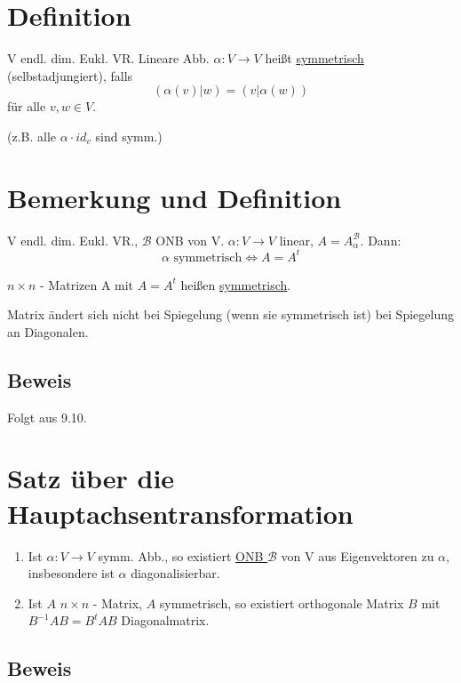 \documentclass[a4paper, openany]{book}
\begin{document}
        \section{Definition}

        V endl. dim. Eukl. VR. Lineare Abb. $\alpha : V \rightarrow V$ heißt \underline{symmetrisch} (selbstadjungiert), falls \[ (\alpha(v) | w) = (v | \alpha(w)) \] für alle $v,w \in V$.

        (z.B. alle $\alpha \cdot id_v$ sind symm.)

        \section{Bemerkung und Definition}

        V endl. dim. Eukl. VR., $\mathcal{B}$ ONB von V. $\alpha: V \rightarrow V$ linear, $A = A_{\alpha}^{\mathcal{B}}$. Dann: \[ \alpha \text{ symmetrisch} \Leftrightarrow A = A^t \]

        $n \times n$ - Matrizen A mit $A = A^t$ heißen \underline{symmetrisch}.

        \par \medskip

        Matrix ändert sich nicht bei Spiegelung (wenn sie symmetrisch ist) bei Spiegelung an Diagonalen.

        \subsection{Beweis}

        Folgt aus 9.10.

        \section{Satz über die Hauptachsentransformation}


        \begin{enumerate}[label=(\alph*)]
          \item Ist $\alpha: V \rightarrow V$ symm. Abb., so existiert \underline{ONB $\mathcal{B}$} von V aus Eigenvektoren zu $\alpha$, insbesondere ist $\alpha$ diagonalisierbar.

          \item Ist $A$ $n \times n$ - Matrix, $A$ symmetrisch, so existiert orthogonale Matrix $B$ mit $B^{-1} A B = B^t A B$ Diagonalmatrix.
        \end{enumerate}

        \subsection{Beweis}
\end{document}
